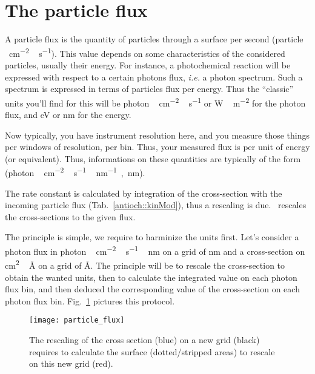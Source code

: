 \section{The particle flux}

A particle flux is the quantity of particles through
a surface per second (\unit{particle\,cm^{-2}\,s^{-1}}). This
value depends on some characteristics of the considered
particles, usually their energy. For instance, a photochemical
reaction will be expressed with respect to a certain photons
flux, \textit{i.e.} a photon spectrum. Such a spectrum is
expressed in terms of particles flux per energy. Thus the
``classic'' units you'll find for this will be
  \unit{photon\,cm^{-2}\,s^{-1}} or \unit{W\,m^{-2}} 
for the photon flux, and
  \unit{eV} or \unit{nm}
for the energy. 

Now typically, you have instrument resolution here, and you
measure those things per windows of resolution, per bin. Thus,
your measured flux is per unit of energy (or equivalent). Thus,
informations on these quantities are typically of the form
(\unit{photon\,cm^{-2}\,s^{-1}\,nm^{-1}}~,~\unit{nm}).

The rate constant is calculated by integration of the
cross-section with the incoming particle flux 
(Tab.~\ref{antioch::kinMod}), thus a rescaling
is due. \Antioch\ rescales the cross-sections to the given
flux.

The principle is simple, we require to harminize the units first. Let's
consider a photon flux in \unit{photon\,cm^{-2}\,s^{-1}\,nm}
on a grid of \unit{nm} and a cross-section on \unit{cm^2\,\AA}
on a grid of \unit{\AA}. The principle will be to rescale
the cross-section to obtain the wanted units, then to calculate
the integrated value on each photon flux bin, and then deduced
the corresponding value of the cross-section on each photon
flux bin. Fig.~\ref{dev:particle_flux_rescaling} pictures
this protocol.

\begin{figure}
\centering
\texttt{[image: particle\_flux]}
\caption{\label{dev:particle_flux_rescaling}The rescaling of the cross section (blue) on
a new grid (black) requires to calculate the surface (dotted/stripped areas) to rescale
on this new grid (red).}
\end{figure}
